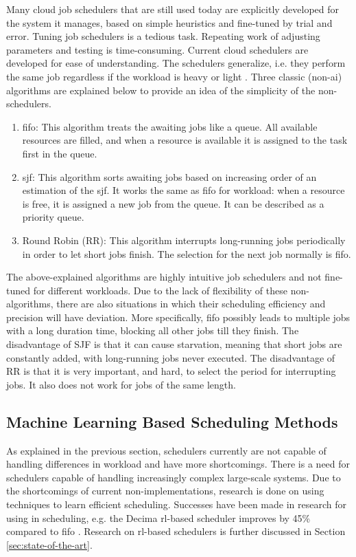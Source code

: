 Many cloud job schedulers that are still used today are explicitly developed
for the system it manages, based on simple heuristics and fine-tuned by trial
and error. Tuning job schedulers is a tedious task. Repeating work of adjusting
parameters and testing is time-consuming. Current cloud schedulers are
developed for ease of understanding. The schedulers generalize,
i.e. they perform the same job regardless if the workload is heavy or
light \cite{mao2019}. Three classic (non-\gls{ai}) algorithms are explained below
to provide an idea of the simplicity of the non-\ai schedulers.
\begin{enumerate}
\item \gls{fifo}: This algorithm treats the awaiting jobs like a queue. All
    available resources are filled, and when a resource is available it is
        assigned to the task first in the queue.
    \item \gls{sjf}: This algorithm sorts awaiting jobs based on increasing
        order of an estimation of the \gls{sjf}. It works the same as
        \gls{fifo} for workload: when a resource is free, it is assigned a new
        job from the queue. It can be described as a priority queue.
\item Round Robin (RR): This algorithm interrupts long-running jobs
    periodically in order to let short jobs finish. The selection for the next
        job normally is \gls{fifo}.
\end{enumerate}
The above-explained algorithms are highly intuitive job schedulers and not
fine-tuned for different workloads. Due to the lack of flexibility of these
non-\ai algorithms, there are also situations in which their scheduling
efficiency and precision will have deviation. More specifically, \gls{fifo} possibly
leads to multiple jobs with a long duration time, blocking all other jobs till
they finish. The disadvantage of SJF is that it can cause starvation, meaning
that short jobs are constantly added, with long-running jobs never executed.
The disadvantage of RR is that it is very important, and hard, to select the
period for interrupting jobs. It also does not work for jobs of the same
length.


\subsection{Machine Learning Based Scheduling Methods}

As explained in the previous section, schedulers currently are not capable of
handling differences in workload and have more shortcomings. There is a need
for schedulers capable of handling increasingly complex large-scale systems.
Due to the shortcomings of current non-\ai implementations, research is done
on using \ml techniques to learn efficient scheduling. Successes have been
made in research for using \ml in scheduling, e.g. the Decima \gls{rl}-based
scheduler improves \jct by 45\% compared to \gls{fifo}
\cite{mao2019}. Research on \gls{rl}-based schedulers is further discussed in
Section \ref{sec:state-of-the-art}.


